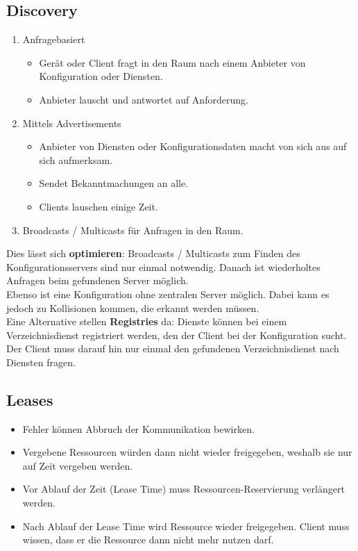 \documentclass{article} %
\begin{document}
\subsection{Discovery}
	\begin{enumerate}
	\item Anfragebasiert
		\begin{itemize}
		\item Gerät oder Client fragt in den Raum nach einem Anbieter von Konfiguration oder Diensten. 
		\item Anbieter lauscht und antwortet auf Anforderung. 
		\end{itemize}
	\item Mittels Advertisements 
		\begin{itemize}
		\item Anbieter von Diensten oder Konfigurationsdaten macht von sich aus auf sich aufmerksam. 
		\item Sendet Bekanntmachungen an alle.
		\item Clients lauschen einige Zeit.
		\end{itemize}
	\item Broadcasts / Multicasts für Anfragen in den Raum.
	\end{enumerate}
Dies lässt sich \textbf{optimieren}: Broadcasts / Multicasts zum Finden des Konfigurationsservers sind nur einmal notwendig. Danach ist wiederholtes Anfragen beim gefundenen Server möglich. \\
Ebenso ist eine Konfiguration ohne zentralen Server möglich. Dabei kann es jedoch zu Kollisionen kommen, die erkannt werden müssen.\\

Eine Alternative stellen \textbf{Registries} da: Dienste können bei einem Verzeichnisdienst registriert werden, den der Client bei der Konfiguration sucht. Der Client muss darauf hin nur einmal den gefundenen Verzeichnisdienst nach Diensten fragen.

\subsection{Leases}
	\begin{itemize}
	\item Fehler können Abbruch der Kommunikation bewirken. 
	\item Vergebene Ressourcen würden dann nicht wieder freigegeben, weshalb sie nur auf Zeit vergeben werden.
	\item Vor Ablauf der Zeit (Lease Time) muss Ressourcen-Reservierung verlängert werden. 
	\item Nach Ablauf der Lease Time wird Ressource wieder freigegeben. Client muss wissen, dass er die Ressource dann nicht mehr nutzen darf.  
	\end{itemize}
	
\end{document}
